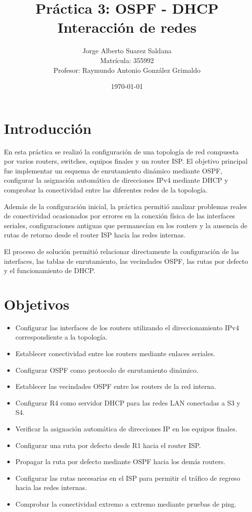 \documentclass[12pt,a4paper]{article}
\title{
Práctica 3: OSPF - DHCP\\[0.5em]
\large Interacción de redes
}
\author{
Jorge Alberto Suarez Saldana\\
\small Matrícula: 355992\\
\small Profesor: Raymundo Antonio González Grimaldo
}
\date{\today}
\begin{document}
\maketitle

\section{Introducción}

En esta práctica se realizó la configuración de una topología de red compuesta por varios routers, switches, equipos finales y un router ISP. El objetivo principal fue implementar un esquema de enrutamiento dinámico mediante OSPF, configurar la asignación automática de direcciones IPv4 mediante DHCP y comprobar la conectividad entre las diferentes redes de la topología.

Además de la configuración inicial, la práctica permitió analizar problemas reales de conectividad ocasionados por errores en la conexión física de las interfaces seriales, configuraciones antiguas que permanecían en los routers y la ausencia de rutas de retorno desde el router ISP hacia las redes internas.

El proceso de solución permitió relacionar directamente la configuración de las interfaces, las tablas de enrutamiento, las vecindades OSPF, las rutas por defecto y el funcionamiento de DHCP.

\section{Objetivos}

\begin{itemize}
\item Configurar las interfaces de los routers utilizando el direccionamiento IPv4 correspondiente a la topología.
\item Establecer conectividad entre los routers mediante enlaces seriales.
\item Configurar OSPF como protocolo de enrutamiento dinámico.
\item Establecer las vecindades OSPF entre los routers de la red interna.
\item Configurar R4 como servidor DHCP para las redes LAN conectadas a S3 y S4.
\item Verificar la asignación automática de direcciones IP en los equipos finales.
\item Configurar una ruta por defecto desde R1 hacia el router ISP.
\item Propagar la ruta por defecto mediante OSPF hacia los demás routers.
\item Configurar las rutas necesarias en el ISP para permitir el tráfico de regreso hacia las redes internas.
\item Comprobar la conectividad extremo a extremo mediante pruebas de ping.
\end{itemize}
\end{document}
